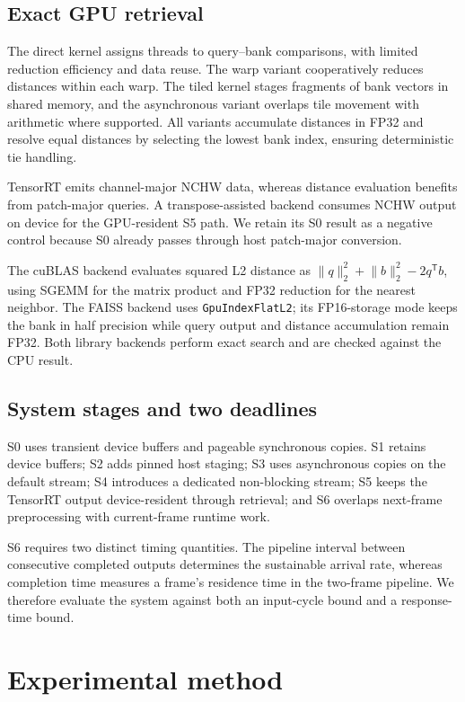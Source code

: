 \documentclass[twocolumn]{svjour3}
\begin{document}
\subsection{Exact GPU retrieval}
The direct kernel assigns threads to query--bank comparisons, with limited
reduction efficiency and data reuse. The warp variant cooperatively reduces
distances within each warp. The tiled kernel stages fragments of bank vectors
in shared memory, and the asynchronous variant overlaps tile movement with
arithmetic where supported. All variants accumulate distances in FP32 and
resolve equal distances by selecting the lowest bank index, ensuring
deterministic tie handling.

TensorRT emits channel-major NCHW data, whereas distance evaluation benefits
from patch-major queries. A transpose-assisted backend consumes NCHW output on
device for the GPU-resident S5 path. We retain its S0 result as a negative
control because S0 already passes through host patch-major conversion.

The cuBLAS backend evaluates squared L2 distance as
$\lVert q\rVert_2^2+\lVert b\rVert_2^2-2q^\mathsf{T}b$, using SGEMM for the
matrix product and FP32 reduction for the nearest neighbor. The FAISS backend
uses \texttt{GpuIndexFlatL2}; its FP16-storage mode keeps the bank in half
precision while query output and distance accumulation remain FP32. Both
library backends perform exact search and are checked against the CPU result.

\subsection{System stages and two deadlines}
S0 uses transient device buffers and pageable synchronous copies. S1 retains
device buffers; S2 adds pinned host staging; S3 uses asynchronous copies on the
default stream; S4 introduces a dedicated non-blocking stream; S5 keeps the
TensorRT output device-resident through retrieval; and S6 overlaps next-frame
preprocessing with current-frame runtime work.

S6 requires two distinct timing quantities. The pipeline interval between
consecutive completed outputs determines the sustainable arrival rate, whereas
completion time measures a frame's residence time in the two-frame pipeline.
We therefore evaluate the system against both an input-cycle bound and a
response-time bound.

\section{Experimental method}\label{sec:method}
\end{document}
